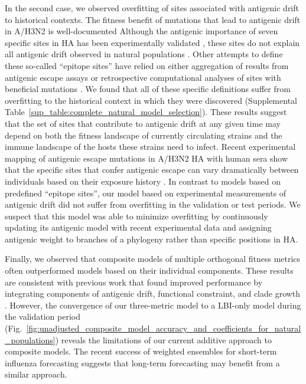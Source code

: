 In the second case, we observed overfitting of sites associated with antigenic drift to historical contexts.
The fitness benefit of mutations that lead to antigenic drift in A/H3N2 is well-documented \cite{Wiley:1981bc,Smith:2004jc,Wolf:2006da,Koel:2013jz}
Although the antigenic importance of seven specific sites in HA has been experimentally validated \cite{Koel:2013jz}, these sites do not explain all antigenic drift observed in natural populations \cite{Neher:2016hy}.
Other attempts to define these so-called ``epitope sites'' have relied on either aggregation of results from antigenic escape assays \cite{Wolf:2006da} or retrospective computational analyses of sites with beneficial mutations \cite{Shih:2007bd,Luksza:2014hj}.
We found that all of these specific definitions suffer from overfitting to the historical context in which they were discovered (Supplemental Table~\ref{sup_table:complete_natural_model_selection}).
These results suggest that the set of sites that contribute to antigenic drift at any given time may depend on both the fitness landscape of currently circulating strains and the immune landscape of the hosts these strains need to infect.
Recent experimental mapping of antigenic escape mutations in A/H3N2 HA with human sera show that the specific sites that confer antigenic escape can vary dramatically between individuals based on their exposure history \cite{Lee2019}.
In contrast to models based on predefined ``epitope sites'', our model based on experimental measurements of antigenic drift did not suffer from overfitting in the validation or test periods.
We suspect that this model was able to minimize overfitting by continuously updating its antigenic model with recent experimental data and assigning antigenic weight to branches of a phylogeny rather than specific positions in HA.

Finally, we observed that composite models of multiple orthogonal fitness metrics often outperformed models based on their individual components.
These results are consistent with previous work that found improved performance by integrating components of antigenic drift, functional constraint, and clade growth \cite{Luksza:2014hj}.
However, the convergence of our three-metric model to a LBI-only model during the validation period (Fig.~\ref{fig:unadjusted_composite_model_accuracy_and_coefficients_for_natural_populations}) reveals the limitations of our current additive approach to composite models.
The recent success of weighted ensembles for short-term influenza forecasting \cite{Reich:2019bq} suggests that long-term forecasting may benefit from a similar approach.

